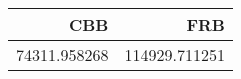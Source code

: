 \begin{tabular}{rr}
\toprule
          CBB &            FRB \\
\midrule
 74311.958268 &  114929.711251 \\
\bottomrule
\end{tabular}
